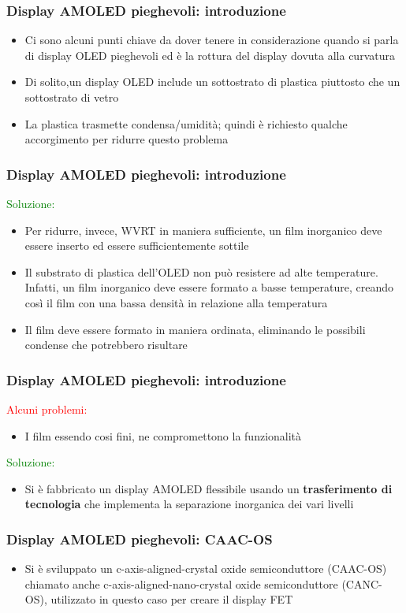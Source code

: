 \documentclass[12pt]{beamer}
\begin{document}
	\begin{frame}
		\frametitle{Display AMOLED pieghevoli: introduzione}
		\begin{itemize}
			\item Ci sono alcuni punti chiave da dover tenere in considerazione quando si parla di display OLED pieghevoli ed è la rottura del display dovuta alla curvatura
			\pause
			\item Di solito,un display OLED include un sottostrato di plastica piuttosto che un sottostrato di vetro
			\pause
			\item La plastica trasmette condensa/umidità; quindi è richiesto qualche accorgimento per ridurre questo problema
		\end{itemize}
	\end{frame}
	\begin{frame}
		\frametitle{Display AMOLED pieghevoli: introduzione}
		\textcolor{green}{Soluzione:}
		\begin{itemize}
			\item Per ridurre, invece, WVRT in maniera sufficiente, un film inorganico deve essere inserto ed essere sufficientemente sottile
			\pause
			\item Il substrato di plastica dell’OLED non può resistere ad alte temperature. Infatti, un film inorganico deve essere
			formato a basse temperature, creando così il film con una bassa densità in relazione alla temperatura
			\pause
			\item Il film deve essere formato in maniera ordinata, eliminando le possibili condense che potrebbero risultare
		\end{itemize}
	\end{frame}
	\begin{frame}
		\frametitle{Display AMOLED pieghevoli: introduzione}
		\textcolor{red}{Alcuni problemi:}
		\begin{itemize}
			\item I film essendo cosi fini, ne compromettono la funzionalità
			\pause
		\end{itemize}
		\textcolor{green}{Soluzione:}
		\begin{itemize}
			\item Si è fabbricato un display AMOLED flessibile usando un \textbf{trasferimento di tecnologia} che implementa la separazione inorganica dei vari livelli
		\end{itemize}
	\end{frame}
	\begin{frame}
		\frametitle{Display AMOLED pieghevoli: CAAC-OS}
		\begin{itemize}
			\item Si è sviluppato un c-axis-aligned-crystal oxide semiconduttore (CAAC-OS) chiamato anche c-axis-aligned-nano-crystal oxide semiconduttore (CANC-OS), utilizzato in questo caso per creare il display FET
		\end{itemize}
	\end{frame}
\end{document}
